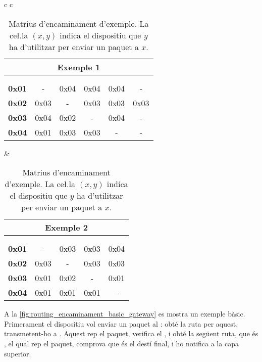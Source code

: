 \documentclass{tfgitic}[2024/07/01]
\begin{document}
{\begin{table}[h!]
    \centering
    \begin{tabular}{c c}
        \begin{tabular}{r|ccccc}
            \multicolumn{6}{c}{\small Exemple 1} \\
            \hline
            \multicolumn{1}{c|}{\vcell{}} & \vcell{\textbf{0x01}} & \vcell{\textbf{0x02}} & \vcell{\textbf{0x03}} & \vcell{\textbf{0x04}} & \vcell{\textbf{0x05}} \\[-\rowheight]
            \multicolumn{1}{c|}{\printcellmiddle} & \printcellbottom & \printcellbottom & \printcellbottom & \printcellbottom & \printcellbottom \\ 
            \hline
            \textbf{0x01} & - & 0x04 & 0x04 & 0x04 & - \\
            \textbf{0x02} & 0x03 & - & 0x03 & 0x03 & 0x03 \\
            \textbf{0x03} & 0x04 & 0x02 & - & 0x04 & - \\
            \textbf{0x04} & 0x01 & 0x03 & 0x03 & - & -
        \end{tabular}
        &
        \begin{tabular}{r|cccc}
            \multicolumn{5}{c}{\small Exemple 2} \\
            \hline
            \multicolumn{1}{c|}{\vcell{}} & \vcell{\textbf{0x01}} & \vcell{\textbf{0x02}} & \vcell{\textbf{0x03}} & \vcell{\textbf{0x04}} \\
            [-\rowheight]
            \multicolumn{1}{c|}{\printcellmiddle} & \printcellbottom & \printcellbottom & \printcellbottom & \printcellbottom  \\ 
            \hline
            \textbf{0x01} & -    & 0x03 & 0x03 & 0x04 \\
            \textbf{0x02} & 0x03 & -    & 0x03 & 0x03 \\
            \textbf{0x03} & 0x01 & 0x02 & -    & 0x01 \\
            \textbf{0x04} & 0x01 & 0x01 & 0x01 & -
        \end{tabular}
    \end{tabular}
    \caption{Matrius d'encaminament d'exemple. La ce\l.la $(x, y)$ indica el dispositiu que $y$ ha d'utilitzar per enviar un paquet a $x$.}
    \label{tab:routing_taula_enc_exemples}
\end{table}


A la \autoref{fig:routing_encaminament_basic_gateway} es mostra un exemple bàsic. Primerament el dispositiu  vol enviar un paquet al : obté la ruta per aquest, transmetent-ho a . Aquest rep el paquet, verifica el , i obté la següent ruta, que és , el qual rep el paquet, comprova que és el destí final, i ho notifica a la capa superior. 

}
\end{document}
